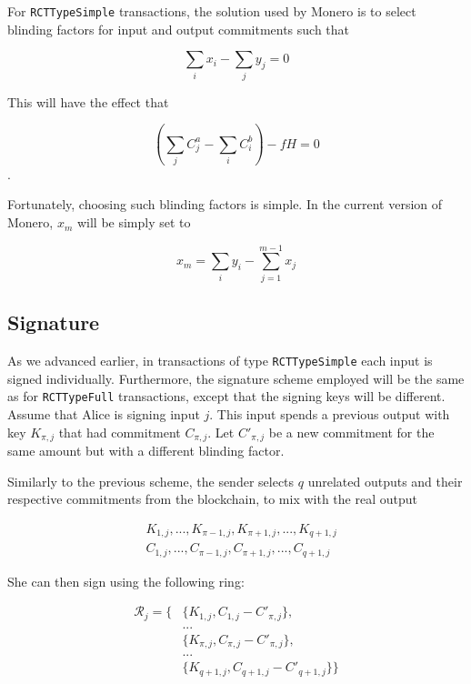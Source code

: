 For {\tt RCTTypeSimple} transactions, the solution used by Monero is to select blinding factors for input and
output commitments such that

\[\sum_i x_i  - \sum_j y_j = 0  \]

This will have the effect that

\[ (\sum_j C^a_{j} - \sum_i C^b_{i}) - f H = 0\].


Fortunately, choosing such blinding factors is simple. In the current version of Monero, \(x_m\) will be simply set
to 

\[x_m = \sum_i y_i - \sum_{j=1}^{m-1} x_j  \]





\subsection{Signature}

As we advanced earlier, in transactions of type {\tt RCTTypeSimple} each input is signed individually.
Furthermore, the signature scheme employed will be the same as for {\tt RCTTypeFull} transactions, 
except that the signing keys will be different.
\\

Assume that Alice is signing input \(j\). This input spends a previous output with key \(K_{\pi, j}\) that had commitment
\(C_{\pi, j}\). Let \(C'_{\pi, j}\) be a new commitment for the same amount but with a different blinding factor.
  
Similarly to the previous scheme, the sender selects \(q\) unrelated outputs and their respective commitments
from the blockchain, to mix with the real output

\begin{align*}
& K_{1, j}, ..., K_{\pi-1, j}, K_{\pi+1, j}, ..., K_{q+1, j} \\
& C_{1, j}, ..., C_{\pi-1, j}, C_{\pi+1, j}, ..., C_{q+1, j}
\end{align*}


She can then sign using the following ring:

\begin{align*}
\mathcal{R}_j = \{ &\{K_{1, j}, C_{1, j} - C'_{\pi, j}\}, \\
&... \\
&\{ K_{\pi, j}, C_{\pi, j} - C'_{\pi, j}\}, \\
&... \\
&\{ K_{q+1, j}, C_{q+1, j} - C'_{q+1, j} \}\}
\end{align*}



